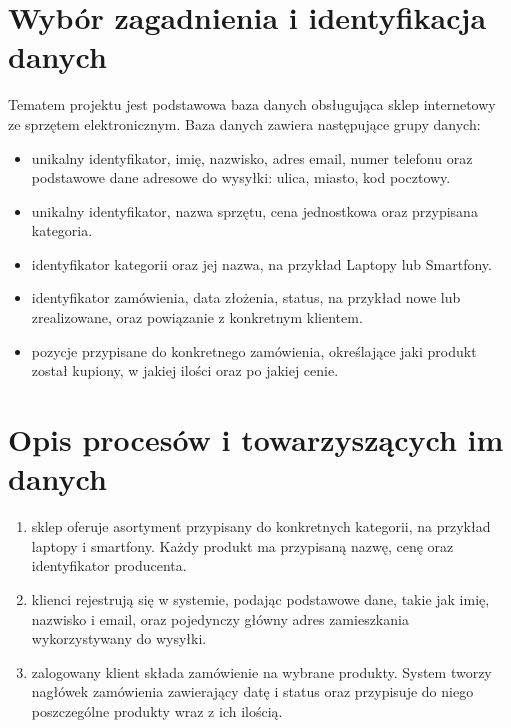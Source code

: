 \documentclass[a4paper,11pt,english,openany,oneside]{sphinxmanual}
\begin{document}
\section{Wybór zagadnienia i identyfikacja danych}
\label{\detokenize{rozdzial_3/index:wybor-zagadnienia-i-identyfikacja-danych}}
\sphinxAtStartPar
Tematem projektu jest podstawowa baza danych obsługująca sklep internetowy ze sprzętem elektronicznym.
Baza danych zawiera następujące grupy danych:
\begin{itemize}
\item {} 
\sphinxAtStartPar
{} unikalny identyfikator, imię, nazwisko, adres e\sphinxhyphen{}mail, numer telefonu oraz podstawowe dane adresowe do wysyłki: ulica, miasto, kod pocztowy.

\item {} 
\sphinxAtStartPar
{} unikalny identyfikator, nazwa sprzętu, cena jednostkowa oraz przypisana kategoria.

\item {} 
\sphinxAtStartPar
{} identyfikator kategorii oraz jej nazwa, na przykład Laptopy lub Smartfony.

\item {} 
\sphinxAtStartPar
{} identyfikator zamówienia, data złożenia, status, na przykład nowe lub zrealizowane, oraz powiązanie z konkretnym klientem.

\item {} 
\sphinxAtStartPar
{} pozycje przypisane do konkretnego zamówienia, określające jaki produkt został kupiony, w jakiej ilości oraz po jakiej cenie.

\end{itemize}


\section{Opis procesów i towarzyszących im danych}
\label{\detokenize{rozdzial_3/index:opis-procesow-i-towarzyszacych-im-danych}}\begin{enumerate}
%
\item {} 
\sphinxAtStartPar
{} sklep oferuje asortyment przypisany do konkretnych kategorii, na przykład laptopy i smartfony. Każdy produkt ma przypisaną nazwę, cenę oraz identyfikator producenta.

\item {} 
\sphinxAtStartPar
{} klienci rejestrują się w systemie, podając podstawowe dane, takie jak imię, nazwisko i e\sphinxhyphen{}mail, oraz pojedynczy główny adres zamieszkania wykorzystywany do wysyłki.

\item {} 
\sphinxAtStartPar
{} zalogowany klient składa zamówienie na wybrane produkty. System tworzy nagłówek zamówienia zawierający datę i status oraz przypisuje do niego poszczególne produkty wraz z ich ilością.

\end{enumerate}
\end{document}
